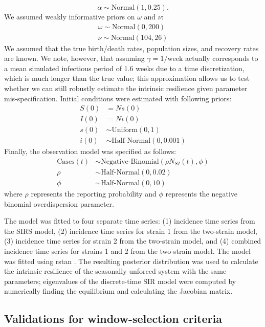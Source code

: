 \documentclass[12pt]{article}
\newcommand{\comment}{\showcomment}
\newcommand{\showcomment}[3]{\textcolor{#1}{\textbf{[#2: }\textsl{#3}\textbf{]}}}
\newcommand{\swp}[1]{\comment{magenta}{SWP}{#1}}
\begin{document}
\begin{equation}
\alpha \sim \mathrm{Normal}(1, 0.25).
\end{equation}
We assumed weakly informative priors on $\omega$ and $\nu$:
\begin{align}
\omega \sim \mathrm{Normal}(0, 200)\\
\nu \sim \mathrm{Normal}(104, 26)
\end{align}
We assumed that the true birth/death rates, population sizes, and recovery rates are known.
We note, however, that assuming $\gamma=1/\mathrm{week}$ actually corresponds to a mean simulated infectious period of 1.6 weeks due to a time discretization, which is much longer than the true value; this approximation allows us to test whether we can still robustly estimate the intrinsic resilience given parameter mis-specification.
Initial conditions were estimated with following priors:
\begin{align}
S(0) &= N s(0)\\
I(0) &= N i(0)\\
s(0) &\sim \textrm{Uniform}(0, 1)\\
i(0) &\sim \textrm{Half-Normal}(0, 0.001)
\end{align}
Finally, the observation model was specified as follows:
\begin{align}
\textrm{Cases}(t) &\sim \textrm{Negative-Binomial}(\rho N_{SI}(t), \phi)\\
\rho &\sim \textrm{Half-Normal}(0, 0.02)\\
\phi &\sim \textrm{Half-Normal}(0, 10)
\end{align}
where $\rho$ represents the reporting probability and $\phi$ represents the negative binomial overdispersion parameter.

The model was fitted to four separate time series: (1) incidence time series from the SIRS model, (2) incidence time series for strain 1 from the two-strain model, (3) incidence time series for strain 2 from the two-strain model, and (4) combined incidence time series for strains 1 and 2 from the two-strain model.
The model was fitted using rstan \citep{carpenter2017stan,rstan}.
The resulting posterior distribution was used to calculate the intrinsic resilience of the seasonally unforced system with the same parameters;
eigenvalues of the discrete-time SIR model were computed by numerically finding the equilibrium and calculating the Jacobian matrix.

\subsection*{Validations for window-selection criteria}
\end{document}
